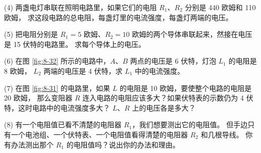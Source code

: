 (4) 两盏电灯串联在照明电路里，如果它们的电阻 $R_1$、$R_2$ 分别是 440 欧姆和 110 欧姆，
求这段电路的总电阻，每盏灯里的电流强度，每盏灯两端的电压。

(5) 把电阻分别是 $R_1 = 5$ 欧姆、$R_2 = 10$ 欧姆的两个导体串联起来，然接在电压是 15 伏特的电路里。
求每个导体上的电压。

(6) 在图 \ref{fig:8-32} 所示的电路中，$A$、$B$ 两点的电压是 6 伏特，灯泡 $L_1$ 的电阻是 8 欧姆，
$L_2$ 两端的电压是 4 伏特，求 $L_1$ 中的电流强度。

(7) 在图 \ref{fig:8-31} 的电路里，如果 $L$ 的电阻是 10 欧姆，要使整个电路的电阻是 20 欧姆，
那么变阻器 $R$ 连入电路的电阻应该多大？如果伏特表的示数仍为 4 伏特，这时电路中的电流强度多大？
$L$、$R$ 上的电压各是多大？

(8) 有一个电阻值已看不清楚的电阻器 $R_1$，我们想要测出它的电阻值。
但手边只有一个电池组、一个伏特表、一个电阻值看得清楚的电阻器 $R_2$ 和几根导线。
你有办法测出那个 $R_1$ 的电阻值吗？说出你的办法和理由。

